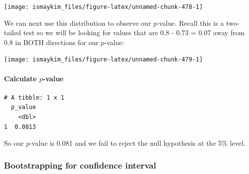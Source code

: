 \documentclass[12pt,]{krantz}
\makeatletter
\newenvironment{Shaded}{\begin{snugshade}}{\end{snugshade}}
\newcommand{\KeywordTok}[1]{\textcolor[rgb]{0.27,0.27,0.27}{\textbf{#1}}}
\newcommand{\DataTypeTok}[1]{\textcolor[rgb]{0.27,0.27,0.27}{#1}}
\newcommand{\StringTok}[1]{\textcolor[rgb]{0.5,0.5,0.5}{#1}}
\newcommand{\OperatorTok}[1]{\textcolor[rgb]{0.43,0.43,0.43}{\textbf{#1}}}
\newcommand{\NormalTok}[1]{#1}
\let\oldparagraph\paragraph
\renewcommand{\paragraph}[1]{\oldparagraph{#1}\mbox{}}
\newenvironment{kframe}{%
\medskip{}
\setlength{\fboxsep}{.8em}
 \def\at@end@of@kframe{}%
 \ifinner\ifhmode%
  \def\at@end@of@kframe{\end{minipage}}%
  \begin{minipage}{\columnwidth}%
 \fi\fi%
 \def\FrameCommand##1{\hskip\@totalleftmargin \hskip-\fboxsep
 \colorbox{shadecolor}{##1}\hskip-\fboxsep
     \hskip-\linewidth \hskip-\@totalleftmargin \hskip\columnwidth}%
 \MakeFramed {\advance\hsize-\width
   \@totalleftmargin\z@ \linewidth\hsize
   \@setminipage}}%
 {\par\unskip\endMakeFramed%
 \at@end@of@kframe}
\renewenvironment{Shaded}{\begin{kframe}}{\end{kframe}}
\makeatother
\begin{document}
\begin{center}\texttt{[image: ismaykim\_files/figure-latex/unnamed-chunk-478-1]} \end{center}

We can next use this distribution to observe our \(p\)-value. Recall
this is a two-tailed test so we will be looking for values that are 0.8
- 0.73 = 0.07 away from 0.8 in BOTH directions for our \(p\)-value:

\begin{Shaded}
\end{Shaded}

\begin{center}\texttt{[image: ismaykim\_files/figure-latex/unnamed-chunk-479-1]} \end{center}

\paragraph{\texorpdfstring{Calculate
\(p\)-value}{Calculate p-value}}\label{calculate-p-value-1}

\begin{Shaded}
\end{Shaded}

\begin{verbatim}
# A tibble: 1 x 1
  p_value
    <dbl>
1  0.0813
\end{verbatim}

So our \(p\)-value is 0.081 and we fail to reject the null hypothesis at
the 5\% level.

\subsubsection*{Bootstrapping for confidence
interval}\label{bootstrapping-for-confidence-interval-1}
\end{document}
